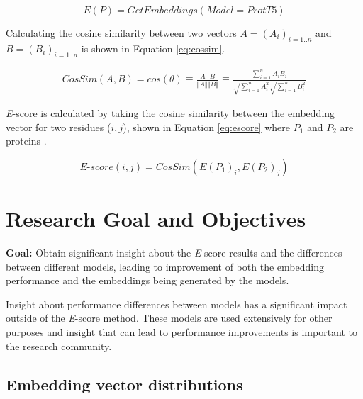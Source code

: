 \documentclass[
	letterpaper, %
	10pt, %
]{journalArticle}
\begin{document}
\begin{equation}
    E(P) = GetEmbeddings(Model = ProtT5)
    \label{eq:embedding}
\end{equation}

Calculating the cosine similarity between two vectors \(A = (A_i)_{i=1..n}\) and \(B = (B_i)_{i=1..n}\) is shown in Equation \ref{eq:cossim}.

\begin{equation}
    \begin{aligned}
        CosSim(A, B) = cos(\theta) \equiv \frac{A \cdot B}{\Vert A \Vert \Vert B \Vert} %
        \equiv \frac{\sum\limits_{i=1}^{n} A_iB_i}{\sqrt{\sum\limits_{i=1}^{n} A_i^2}\sqrt{\sum\limits_{i=1}^{n} B_i^2}}
    \end{aligned}
	\label{eq:cossim}
\end{equation}

\textit{E}-score is calculated by taking the cosine similarity between the embedding vector for two residues (\(i, j\)), shown in Equation \ref{eq:escore} where \(P_1\) and \(P_2\) are proteins \autocite{Ashrafzadeh:2023}.

\begin{equation}
    \textit{E}\mbox{-}score(i,j) = CosSim(E(P_1)_i, E(P_2)_j)
    \label{eq:escore}
\end{equation}

\section{Research Goal and Objectives}
\textbf{Goal: }Obtain significant insight about the \textit{E}-score results and the differences between different models, leading to improvement of both the embedding performance and the embeddings being generated by the models.

Insight about performance differences between models has a significant impact outside of the \textit{E}-score method. These models are used extensively for other purposes and insight that can lead to performance improvements is important to the research community.

\subsection{Embedding vector distributions}
\end{document}
